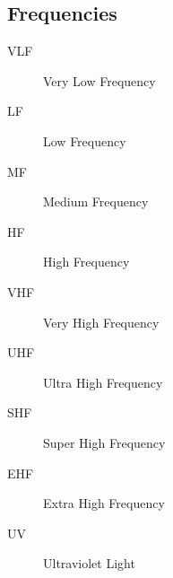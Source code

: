 \documentclass[twocolumn]{article}
\begin{document}
\begin{spacing}{0.5}
\subsection*{Frequencies}
\begin{description}
\item[VLF]Very Low Frequency
\item[LF]Low Frequency
\item[MF]Medium Frequency
\item[HF]High Frequency
\item[VHF]Very High Frequency
\item[UHF]Ultra High Frequency
\item[SHF]Super High Frequency
\item[EHF]Extra High Frequency
\item[UV]Ultraviolet Light
\end{description}


\end{spacing}
\end{document}
